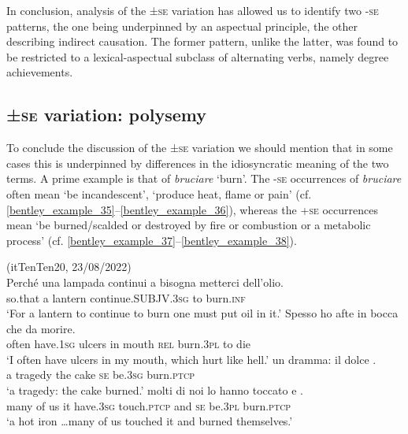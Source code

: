\documentclass[output=paper,colorlinks,citecolor=brown
]{langscibook}
\begin{document}
In conclusion, analysis of the ±\textsc{se} variation has allowed us to identify two -\textsc{se} patterns, the one being underpinned by an aspectual principle, the other describing indirect causation. The former pattern, unlike the latter, was found to be restricted to a lexical-aspectual subclass of alternating verbs, namely degree achievements.

\subsection{±\textsc{se} variation: polysemy}
\label{bentley_section_4.3}

To conclude the discussion of the ±\textsc{se} variation we should mention that in some cases this is underpinned by differences in the idiosyncratic meaning of the two terms. A prime example is that of \textit{bruciare} ‘burn’. The -\textsc{se} occurrences of \textit{bruciare} often mean ‘be incandescent’, ‘produce heat, flame or pain’ (cf. \ref{bentley_example_35}--\ref{bentley_example_36}), whereas the +\textsc{se} occurrences mean ‘be burned/scalded or destroyed by fire or combustion or a metabolic process’ (cf. \ref{bentley_example_37}--\ref{bentley_example_38}).

\ea \label{bentley_example_35}(itTenTen20, 23/08/2022)\\
    \gll Perché		una	lampada	continui											a 	 {bisogna metterci dell’olio.} \\
    	so.that		a				lantern			continue.SUBJV.3\textsc{sg}	to	burn.\textsc{inf} {} \\
    \glt 				‘For a lantern to continue to burn one must put oil in it.’
\ex \label{bentley_example_36}
    \gll Spesso		ho						afte			in	bocca		che			da	morire. \\
    	often			have.1\textsc{sg}	ulcers	in	mouth	\textsc{rel}	burn.3\textsc{pl}		to		die \\
    \glt 				‘I often have ulcers in my mouth, which hurt like hell.’
\ex \label{bentley_example_37}
    \gll  {\ldots}  un dramma: il		dolce  					. \\
    	{} a			tragedy		the	cake		\textsc{se}		be.3\textsc{sg}	burn.\textsc{ptcp} \\
    \glt 	‘a tragedy: the cake burned.’
\ex \label{bentley_example_38}
     molti di		noi	lo	hanno			toccato				e								. \\
    	{} many	of		us		it	have.3\textsc{sg}	touch.\textsc{ptcp}		and	\textsc{se}	be.3\textsc{pl}		burn.\textsc{ptcp} \\
    \glt ‘a hot iron  \ldots  many of us touched it and burned themselves.’	
\z
\end{document}
